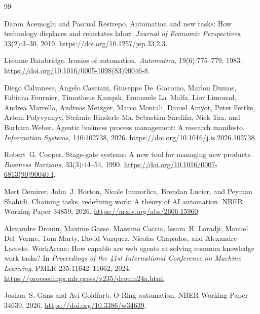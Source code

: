 \begin{thebibliography}{99}
\raggedright

Daron Acemoglu and Pascual Restrepo.
\newblock Automation and new tasks: How technology displaces and reinstates labor.
\newblock \emph{Journal of Economic Perspectives}, 33(2):3--30, 2019.
\newblock \url{https://doi.org/10.1257/jep.33.2.3}.

Lisanne Bainbridge.
\newblock Ironies of automation.
\newblock \emph{Automatica}, 19(6):775--779, 1983.
\newblock \url{https://doi.org/10.1016/0005-1098(83)90046-8}.

Diego Calvanese, Angelo Casciani, Giuseppe De~Giacomo, Marlon Dumas, Fabiana Fournier,
Timotheus Kampik, Emanuele La~Malfa, Lior Limonad, Andrea Marrella, Andreas Metzger,
Marco Montali, Daniel Amyot, Peter Fettke, Artem Polyvyanyy, Stefanie Rinderle-Ma,
Sebastian Sardi\~na, Niek Tax, and Barbara Weber.
\newblock Agentic business process management: A research manifesto.
\newblock \emph{Information Systems}, 140:102738, 2026.
\newblock \url{https://doi.org/10.1016/j.is.2026.102738}.

Robert~G. Cooper.
\newblock Stage-gate systems: A new tool for managing new products.
\newblock \emph{Business Horizons}, 33(3):44--54, 1990.
\newblock \url{https://doi.org/10.1016/0007-6813(90)90040-I}.

Mert Demirer, John~J. Horton, Nicole Immorlica, Brendan Lucier, and Peyman Shahidi.
\newblock Chaining tasks, redefining work: A theory of AI automation.
\newblock NBER Working Paper 34859, 2026.
\newblock \url{https://arxiv.org/abs/2606.15960}.

Alexandre Drouin, Maxime Gasse, Massimo Caccia, Issam~H. Laradji, Manuel Del~Verme,
Tom Marty, David Vazquez, Nicolas Chapados, and Alexandre Lacoste.
\newblock WorkArena: How capable are web agents at solving common knowledge work tasks?
\newblock In \emph{Proceedings of the 41st International Conference on Machine Learning},
PMLR 235:11642--11662, 2024.
\newblock \url{https://proceedings.mlr.press/v235/drouin24a.html}.

Joshua~S. Gans and Avi Goldfarb.
\newblock O-Ring automation.
\newblock NBER Working Paper 34639, 2026.
\newblock \url{https://doi.org/10.3386/w34639}.


\end{thebibliography}
